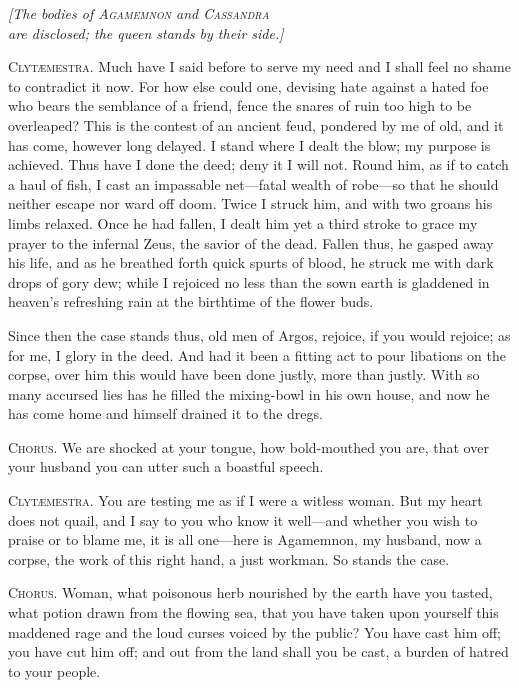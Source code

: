 \documentclass[12pt]{article}
\begin{document}
\begin{center}
\textit{[The bodies of \textsc{Agamemnon} and \textsc{Cassandra}\\
are disclosed; the queen stands by their side.]}
\end{center}

\textsc{Clyt{\ae}mestra.} Much have I said before to serve my need and I shall feel no shame to contradict it now. For how else could one, devising hate against a hated foe who bears the semblance of a friend, fence the snares of ruin too high to be overleaped? This is the contest of an ancient feud, pondered by me of old, and it has come, however long delayed. I stand where I dealt the blow; my purpose is achieved. Thus have I done the deed; deny it I will not. Round him, as if to catch a haul of fish, I cast an impassable net---fatal wealth of robe---so that he should neither escape nor ward off doom. Twice I struck him, and with two groans his limbs relaxed. Once he had fallen, I dealt him yet a third stroke to grace my prayer to the infernal Zeus, the savior of the dead. Fallen thus, he gasped away his life, and as he breathed forth quick spurts of blood, he struck me with dark drops of gory dew; while I rejoiced no less than the sown earth is gladdened in heaven's refreshing rain at the birthtime of the flower buds.

Since then the case stands thus, old men of Argos, rejoice, if you would rejoice; as for me, I glory in the deed. And had it been a fitting act to pour libations on the corpse, over him this would have been done justly, more than justly. With so many accursed lies has he filled the mixing-bowl in his own house, and now he has come home and himself drained it to the dregs.

\textsc{Chorus.} We are shocked at your tongue, how bold-mouthed you are, that over your husband you can utter such a boastful speech.

\textsc{Clyt{\ae}mestra.} You are testing me as if I were a witless woman. But my heart does not quail, and I say to you who know it well---and whether you wish to praise or to blame me, it is all one---here is Agamemnon, my husband, now a corpse, the work of this right hand, a just workman. So stands the case.

\textsc{Chorus.} Woman, what poisonous herb nourished by the earth have you tasted, what potion drawn from the flowing sea, that you have taken upon yourself this maddened rage and the loud curses voiced by the public? You have cast him off; you have cut him off; and out from the land shall you be cast, a burden of hatred to your people.
\end{document}
